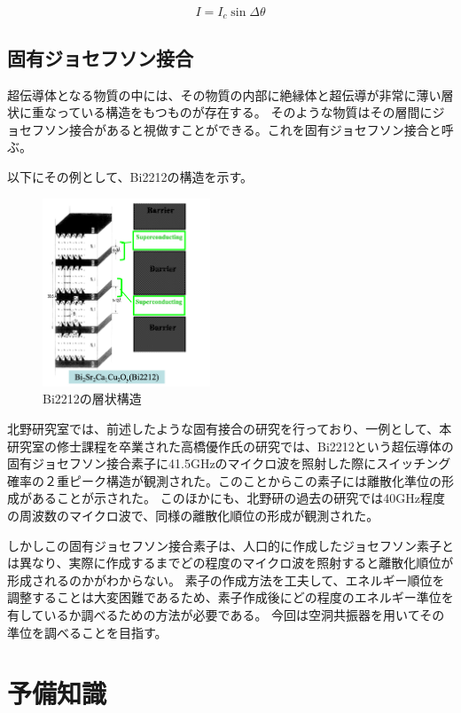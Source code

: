 \[ I = I_c \sin{\Delta \theta } \]

\subsection*{固有ジョセフソン接合}
超伝導体となる物質の中には、その物質の内部に絶縁体と超伝導が非常に薄い層状に重なっている構造をもつものが存在する。
そのような物質はその層間にジョセフソン接合があると視做すことができる。これを固有ジョセフソン接合と呼ぶ。

以下にその例として、Bi2212の構造を示す。\cite{びすます}
\vspace{10 mm}

\begin{figure}[h]
  \begin{center}
    \includegraphics[width=5cm]{./image/IJJ.png}
    \caption{Bi2212の層状構造}
    \label{fig:Cavity}
  \end{center}
\end{figure}

北野研究室では、前述したような固有接合の研究を行っており、一例として、本研究室の修士課程を卒業された高橋優作氏の研究\cite{たかはし}では、Bi2212という超伝導体の固有ジョセフソン接合素子に41.5GHzのマイクロ波を照射した際にスイッチング確率の２重ピーク構造が観測された。このことからこの素子には離散化準位の形成があることが示された。
このほかにも、北野研の過去の研究では40GHz程度の周波数のマイクロ波で、同様の離散化順位の形成が観測された。

しかしこの固有ジョセフソン接合素子は、人口的に作成したジョセフソン素子とは異なり、実際に作成するまでどの程度のマイクロ波を照射すると離散化順位が形成されるのかがわからない。
素子の作成方法を工夫して、エネルギー順位を調整することは大変困難であるため、素子作成後にどの程度のエネルギー準位を有しているか調べるための方法が必要である。
今回は空洞共振器を用いてその準位を調べることを目指す。

\section{予備知識}
